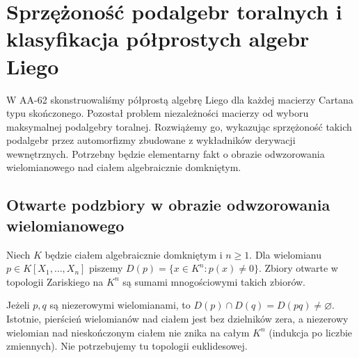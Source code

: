 \chapter[Klasyfikacja algebr Liego]{Sprzężoność podalgebr toralnych i klasyfikacja półprostych algebr Liego}
\label{aa:ch:lie-classification}

W AA-62 skonstruowaliśmy półprostą algebrę Liego dla każdej macierzy Cartana typu skończonego. Pozostał problem niezależności macierzy od wyboru maksymalnej podalgebry toralnej. Rozwiążemy go, wykazując sprzężoność takich podalgebr przez automorfizmy zbudowane z wykładników derywacji wewnętrznych. Potrzebny będzie elementarny fakt o obrazie odwzorowania wielomianowego nad ciałem algebraicznie domkniętym.

\section{Otwarte podzbiory w obrazie odwzorowania wielomianowego}

\begin{definicja}
\label{aa:def:lie-zariski-principal}
Niech $K$ będzie ciałem algebraicznie domkniętym i $n\ge1$. Dla wielomianu $p\in K[X_1,\ldots,X_n]$ piszemy
$D(p)=\{x\in K^n:p(x)\ne0\}$. Zbiory otwarte w topologii Zariskiego na $K^n$ są sumami mnogościowymi takich zbiorów.
\end{definicja}

Jeżeli $p,q$ są niezerowymi wielomianami, to $D(p)\cap D(q)=D(pq)\ne\varnothing$. Istotnie, pierścień wielomianów nad ciałem jest bez dzielników zera, a niezerowy wielomian nad nieskończonym ciałem nie znika na całym $K^n$ (indukcja po liczbie zmiennych). Nie potrzebujemy tu topologii euklidesowej.

